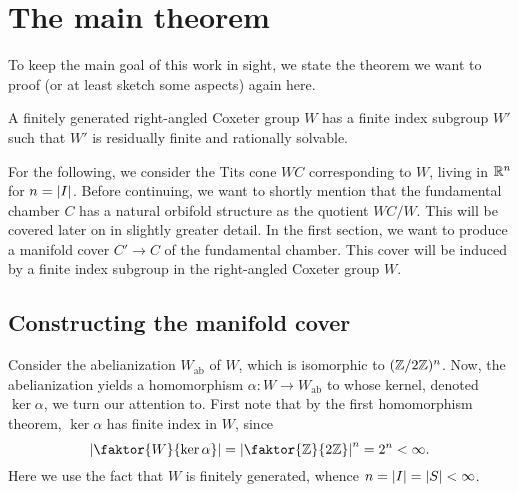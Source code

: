 \chapter{The main theorem}

To keep the main goal of this work in sight, we state the theorem we want to proof (or at least sketch some aspects) again here.

\begin{theorem*}
    A finitely generated right-angled Coxeter group \(W\) has a finite index subgroup \(W'\) such that \(W'\) is residually finite and rationally solvable.
\end{theorem*}


For the following, we consider the Tits cone \(WC\) corresponding to \(W\), living in \(\mathbb{R}^n\) for \(n = \left\vert I\right\vert\).
Before continuing, we want to shortly mention that the fundamental chamber \(C\) has a natural orbifold structure as the quotient \(WC/W\).
This will be covered later on in slightly greater detail.
In the first section, we want to produce a manifold cover \(C' \to C\) of the fundamental chamber.
This cover will be induced by a finite index subgroup in the right-angled Coxeter group \(W\).


\section{Constructing the manifold cover}

Consider the abelianization \(W_{\text{ab}}\) of \(W\), which is isomorphic to \((\mathbb{Z}/2\mathbb{Z})^{n}\).
Now, the abelianization yields a homomorphism \(\alpha : W \to W_{\text{ab}}\) to whose kernel, denoted \(\ker\alpha\), we turn our attention to. %
First note that by the first homomorphism theorem, \(\ker\alpha\) has finite index in \(W\), since
\[\abs{\faktor{W}{\ker\alpha}} = \abs{\faktor{\Z}{2\Z}}^{n} = 2^{n} < \infty.\]
Here we use the fact that \(W\) is finitely generated, whence \(n = \left\vert I\right\vert = \left\vert S\right\vert < \infty\).

